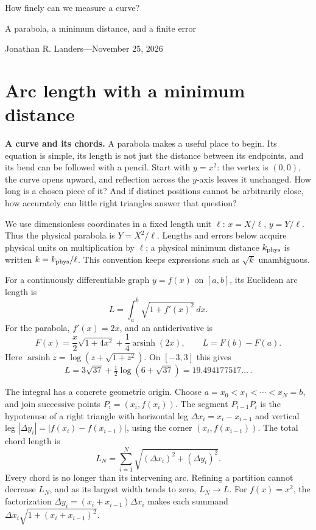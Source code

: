 \documentclass[11pt]{article}
\newcommand{\notesubsection}[1]{\par\addvspace{6pt}\noindent\textbf{#1.}\nobreakspace}
\newcommand{\asinh}{\operatorname{arsinh}}
\begin{document}
\begin{center}
{\LARGE How finely can we measure a curve?\par}
\smallskip
{\large A parabola, a minimum distance, and a finite error\par}
\medskip
Jonathan R. Landers\quad---\quad November 25, 2026
\end{center}

\section{Arc length with a minimum distance}
\notesubsection{A curve and its chords}
A parabola makes a useful place to begin. Its equation is simple,
its length is not just the distance between its endpoints, and its bend
can be followed with a pencil. Start with $y=x^2$: the vertex is $(0,0)$,
the curve opens upward, and reflection across the $y$-axis leaves it
unchanged. How long is a chosen piece of it? And if distinct positions
cannot be arbitrarily close, how accurately can little right triangles
answer that question?

We use dimensionless coordinates in a fixed length unit $\ell$:
$x=X/\ell$, $y=Y/\ell$. Thus the physical parabola is $Y=X^2/\ell$.
Lengths and errors below acquire physical units on multiplication by
$\ell$; a physical minimum distance $k_{\rm phys}$ is written
$k=k_{\rm phys}/\ell$. This convention keeps expressions such as
$\sqrt{k}$ unambiguous.

For a continuously differentiable graph $y=f(x)$ on $[a,b]$, its
Euclidean arc length is
\begin{equation}\label{eq:length}
 L=\int_a^b\sqrt{1+f'(x)^2}\,dx.
\end{equation}
For the parabola, $f'(x)=2x$, and an antiderivative is
\begin{equation}\label{eq:primitive}
 F(x)=\frac{x}{2}\sqrt{1+4x^2}+\frac14\asinh(2x),
 \qquad L=F(b)-F(a).
\end{equation}
Here $\asinh z=\log(z+\sqrt{1+z^2})$. On $[-3,3]$ this gives
\begin{equation}\label{eq:exact}
 L=3\sqrt{37}+\tfrac12\log(6+\sqrt{37})
   =19.494177517\ldots\,.
\end{equation}

The integral has a concrete geometric origin. Choose
$a=x_0<x_1<\cdots<x_N=b$, and join successive points
$P_i=(x_i,f(x_i))$. The segment $P_{i-1}P_i$ is the hypotenuse of
a right triangle with horizontal leg $\Delta x_i=x_i-x_{i-1}$ and
vertical leg $|\Delta y_i|=|f(x_i)-f(x_{i-1})|$, using the corner
$(x_i,f(x_{i-1}))$. The total chord length is
\begin{equation}\label{eq:polygon}
 L_N=\sum_{i=1}^N\sqrt{(\Delta x_i)^2+(\Delta y_i)^2}.
\end{equation}
Every chord is no longer than its intervening arc. Refining a partition
cannot decrease $L_N$, and as its largest width tends to zero,
$L_N\to L$. For $f(x)=x^2$, the factorization
$\Delta y_i=(x_i+x_{i-1})\Delta x_i$ makes each summand
$\Delta x_i\sqrt{1+(x_i+x_{i-1})^2}$.
\end{document}
